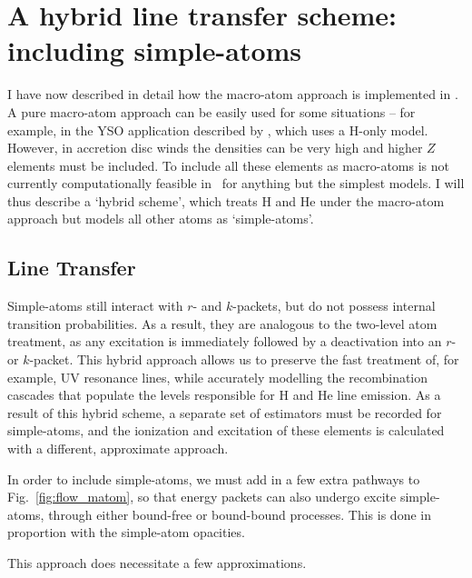 
\section{A hybrid line transfer scheme: including simple-atoms}

I have now described in detail how the macro-atom approach is 
implemented in \py. A pure macro-atom approach can be easily used for
some situations -- for example, in the YSO application described by 
\cite{simmacro2005}, which uses a H-only model. However, in accretion
disc winds the densities can be very high and higher $Z$ elements must be 
included. To include all these elements as macro-atoms is not
currently computationally feasible in \py\ for anything but the simplest
models. I will thus describe a `hybrid scheme', which treats H and He
under the macro-atom approach but models all other atoms 
as `simple-atoms'. 

\subsection{Line Transfer}

Simple-atoms still interact with $r$- and $k$-packets,
but do not possess internal transition probabilities. As a result,
they are analogous to the two-level atom treatment, as any excitation
is immediately followed by a deactivation into an $r$- or $k$-packet.
This hybrid approach allows us to preserve the fast treatment 
of, for example, UV resonance lines, while accurately 
modelling the recombination cascades that populate the levels 
responsible for H and He line emission. As a result of this hybrid
scheme, a separate set of estimators must be recorded for simple-atoms, 
and the ionization and excitation of these elements is calculated 
with a different, approximate approach.

In order to include simple-atoms, we must add in a few extra pathways
to Fig.~\ref{fig:flow_matom}, so that energy packets can also
undergo excite simple-atoms, through either bound-free or bound-bound
processes. This is done in proportion with the simple-atom opacities.

This approach does necessitate a few approximations.

